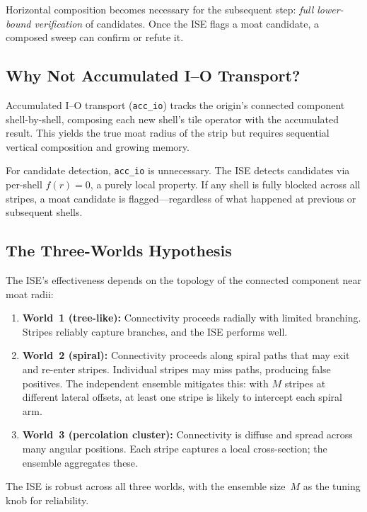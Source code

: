 \documentclass[11pt,a4paper]{article}
\theoremstyle{definition}
\theoremstyle{remark}
\begin{document}
Horizontal composition becomes necessary for the subsequent step:
\emph{full lower-bound verification} of candidates.  Once the ISE
flags a moat candidate, a composed sweep can confirm or refute it.

\subsection{Why Not Accumulated I--O Transport?}

Accumulated I--O transport (\texttt{acc\_io}) tracks the origin's
connected component shell-by-shell, composing each new shell's tile
operator with the accumulated result.  This yields the true moat
radius of the strip but requires sequential vertical composition and
growing memory.

For candidate detection, \texttt{acc\_io} is unnecessary.  The ISE
detects candidates via per-shell $f(r) = 0$, a purely local property.
If any shell is fully blocked across all stripes, a moat candidate
is flagged---regardless of what happened at previous or subsequent
shells.

\subsection{The Three-Worlds Hypothesis}

The ISE's effectiveness depends on the topology of the connected
component near moat radii:

\begin{enumerate}
  \item \textbf{World~1 (tree-like):} Connectivity proceeds
    radially with limited branching.  Stripes reliably capture
    branches, and the ISE performs well.
  \item \textbf{World~2 (spiral):} Connectivity proceeds along
    spiral paths that may exit and re-enter stripes.  Individual
    stripes may miss paths, producing false positives.  The
    independent ensemble mitigates this: with $M$ stripes at
    different lateral offsets, at least one stripe is likely to
    intercept each spiral arm.
  \item \textbf{World~3 (percolation cluster):} Connectivity is
    diffuse and spread across many angular positions.  Each stripe
    captures a local cross-section; the ensemble aggregates these.
\end{enumerate}

The ISE is robust across all three worlds, with the ensemble
size~$M$ as the tuning knob for reliability.
\end{document}
